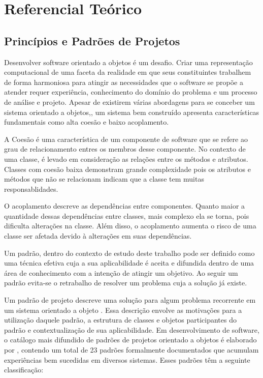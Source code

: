 \chapter{Referencial Teórico}

\section{Princípios e Padrões de Projetos}


Desenvolver software orientado a objetos é um desafio. Criar uma representação
computacional de uma faceta da realidade em que seus constituintes trabalhem de
forma harmoniosa para atingir as necessidades que o software se propõe a
atender requer experiência, conhecimento do domínio do problema e um processo de
análise e projeto. Apesar de existirem várias abordagens para se conceber um
sistema orientado a objetos\cite{evans2004ddd},\cite{gomma11}, um sistema bem
construído apresenta características fundamentais como alta coesão e
baixo acoplamento.

A Coesão é uma característica de um componente de software que se refere ao grau
de relacionamento entres os membros desse componente. No contexto de uma classe,
é levado em consideração as relações entre os métodos e atributos. Classes com
coesão baixa demonstram grande complexidade pois os atributos e métodos que não
se relacionam indicam que a classe tem muitas responsablidades.

O acoplamento descreve as dependências entre componentes. Quanto maior a
quantidade dessas dependências entre classes, mais complexo ela se torna, pois
dificulta  alterações na classe. Além disso, o acoplamento aumenta o risco de
uma classe ser afetada devido à alterações em suas dependências.

Um padrão, dentro do contexto de estudo deste trabalho pode ser definido
como uma técnica efetiva cuja a sua aplicabilidade é aceita e difundida dentro
de uma área de conhecimento com a intenção de atingir um
objetivo\cite{MetskerWake06}. Ao seguir um padrão evita-se o retrabalho de
resolver um problema cuja a solução já existe.

Um padrão de projeto descreve uma solução para algum problema recorrente em um
sistema orientado a objeto \cite{gof}. Essa descrição envolve as motivações para
a utilização daquele padrão, a estrutura de classes e objetos participantes do
padrão e contextualização de sua aplicabilidade. Em desenvolvimento de software,
o catálogo mais difundido de padrões de projetos orientado a objetos é elaborado
por , contendo um total de 23 padrões formalmente documentados
que acumulam experiências bem sucedidas em diversos sistemas. Esses padrões têm
a seguinte classificação:

